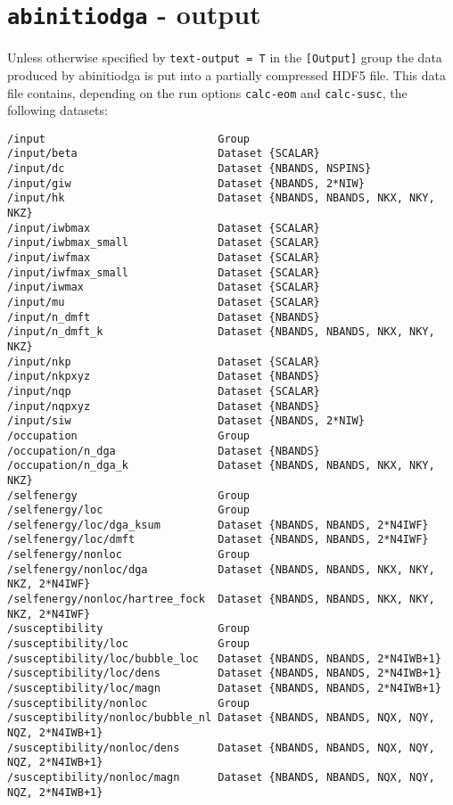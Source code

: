 \documentclass[a4paper,11pt]{article}
\numberwithin{equation}{section} %
\begin{document}
\section{\protect\Verb+abinitiodga+ - output}
Unless otherwise specified by \verb|text-output = T| in the {\color{red}\verb|[Output]|} group the data produced by abinitiodga is put into a partially compressed HDF5 file. This data file contains, depending on the run options \verb|calc-eom| and \verb|calc-susc|, the following datasets:

\begin{lstlisting}[caption=ADGA output format for a q-grid, frame=single, basicstyle=\small]
/input                           Group
/input/beta                      Dataset {SCALAR}
/input/dc                        Dataset {NBANDS, NSPINS}
/input/giw                       Dataset {NBANDS, 2*NIW}
/input/hk                        Dataset {NBANDS, NBANDS, NKX, NKY, NKZ}
/input/iwbmax                    Dataset {SCALAR}
/input/iwbmax_small              Dataset {SCALAR}
/input/iwfmax                    Dataset {SCALAR}
/input/iwfmax_small              Dataset {SCALAR}
/input/iwmax                     Dataset {SCALAR}
/input/mu                        Dataset {SCALAR}
/input/n_dmft                    Dataset {NBANDS}
/input/n_dmft_k                  Dataset {NBANDS, NBANDS, NKX, NKY, NKZ}
/input/nkp                       Dataset {SCALAR}
/input/nkpxyz                    Dataset {NBANDS}
/input/nqp                       Dataset {SCALAR}
/input/nqpxyz                    Dataset {NBANDS}
/input/siw                       Dataset {NBANDS, 2*NIW}
/occupation                      Group
/occupation/n_dga                Dataset {NBANDS}
/occupation/n_dga_k              Dataset {NBANDS, NBANDS, NKX, NKY, NKZ}
/selfenergy                      Group
/selfenergy/loc                  Group
/selfenergy/loc/dga_ksum         Dataset {NBANDS, NBANDS, 2*N4IWF}
/selfenergy/loc/dmft             Dataset {NBANDS, NBANDS, 2*N4IWF}
/selfenergy/nonloc               Group
/selfenergy/nonloc/dga           Dataset {NBANDS, NBANDS, NKX, NKY, NKZ, 2*N4IWF}
/selfenergy/nonloc/hartree_fock  Dataset {NBANDS, NBANDS, NKX, NKY, NKZ, 2*N4IWF}
/susceptibility                  Group
/susceptibility/loc              Group
/susceptibility/loc/bubble_loc   Dataset {NBANDS, NBANDS, 2*N4IWB+1}
/susceptibility/loc/dens         Dataset {NBANDS, NBANDS, 2*N4IWB+1}
/susceptibility/loc/magn         Dataset {NBANDS, NBANDS, 2*N4IWB+1}
/susceptibility/nonloc           Group
/susceptibility/nonloc/bubble_nl Dataset {NBANDS, NBANDS, NQX, NQY, NQZ, 2*N4IWB+1}
/susceptibility/nonloc/dens      Dataset {NBANDS, NBANDS, NQX, NQY, NQZ, 2*N4IWB+1}
/susceptibility/nonloc/magn      Dataset {NBANDS, NBANDS, NQX, NQY, NQZ, 2*N4IWB+1}
\end{lstlisting}
\end{document}

